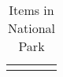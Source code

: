 \begin{longtable}{|| l l l l ||}%
\hline%
\endhead%
\hline%
\caption{Items in National Park}%
\label{tab:NationalParkItems}%
\end{longtable}